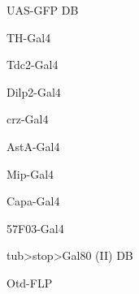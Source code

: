 \documentclass[17pt]{extarticle}
\begin{document}
\begin{large}
UAS-GFP DB \\[0.5em]
\end{large}
\footnotesize
\newpage\vspace*{-0.15cm}
\begin{large}
TH-Gal4 \\[0.5em]
\end{large}
\footnotesize
\newpage\vspace*{-0.15cm}
\begin{large}
Tdc2-Gal4 \\[0.5em]
\end{large}
\footnotesize
\newpage\vspace*{-0.15cm}
\begin{large}
Dilp2-Gal4 \\[0.5em]
\end{large}
\footnotesize
\newpage\vspace*{-0.15cm}
\begin{large}
crz-Gal4 \\[0.5em]
\end{large}
\footnotesize
\newpage\vspace*{-0.15cm}
\begin{large}
AstA-Gal4 \\[0.5em]
\end{large}
\footnotesize
\newpage\vspace*{-0.15cm}
\begin{large}
Mip-Gal4 \\[0.5em]
\end{large}
\footnotesize
\newpage\vspace*{-0.15cm}
\begin{large}
Capa-Gal4 \\[0.5em]
\end{large}
\footnotesize
\newpage\vspace*{-0.15cm}
\begin{large}
57F03-Gal4 \\[0.5em]
\end{large}
\footnotesize
\newpage\vspace*{-0.15cm}
\begin{footnotesize}
tub>stop>Gal80 (II) DB \\[0.5em]
\end{footnotesize}
\footnotesize
\newpage\vspace*{-0.15cm}
\begin{large}
Otd-FLP \\[0.5em]
\end{large}
\end{document}
